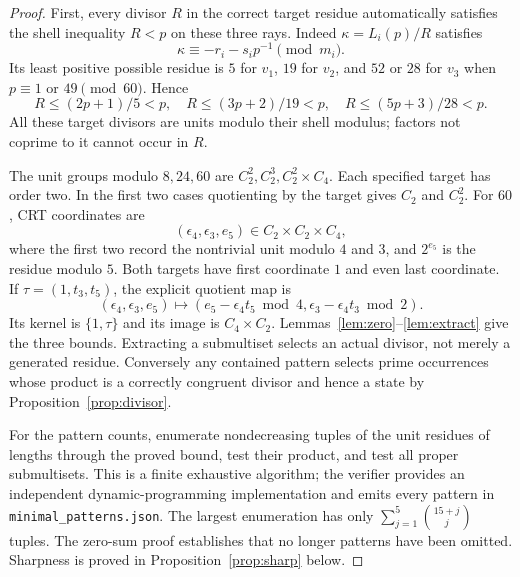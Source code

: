 \documentclass[11pt]{article}
\theoremstyle{remark}\newtheorem{remark}[theorem]{Remark}
\begin{document}
\begin{proof}
First, every divisor $R$ in the correct target residue automatically satisfies the shell inequality $R<p$ on these three rays. Indeed $\kappa=L_i(p)/R$ satisfies
\[
 \kappa\equiv-r_i-s_i p^{-1}\pmod{m_i}.
\]
Its least positive possible residue is $5$ for $v_1$, $19$ for $v_2$, and $52$ or $28$ for $v_3$ when $p\equiv1$ or $49\pmod{60}$. Hence
\[
 R\le(2p+1)/5<p,\quad R\le(3p+2)/19<p,\quad
 R\le(5p+3)/28<p.
\]
All these target divisors are units modulo their shell modulus; factors not coprime to it cannot occur in $R$.

The unit groups modulo $8,24,60$ are $C_2^2,C_2^3,C_2^2\times C_4$. Each specified target has order two. In the first two cases quotienting by the target gives $C_2$ and $C_2^2$. For $60$, CRT coordinates are
\[
 (\epsilon_4,\epsilon_3,e_5)\in C_2\times C_2\times C_4,
\]
where the first two record the nontrivial unit modulo $4$ and $3$, and $2^{e_5}$ is the residue modulo $5$. Both targets have first coordinate $1$ and even last coordinate. If $\tau=(1,t_3,t_5)$, the explicit quotient map is
\[
 (\epsilon_4,\epsilon_3,e_5)\mapsto
 (e_5-\epsilon_4t_5\bmod4,\epsilon_3-\epsilon_4t_3\bmod2).
\]
Its kernel is $\{1,\tau\}$ and its image is $C_4\times C_2$. Lemmas~\ref{lem:zero}--\ref{lem:extract} give the three bounds. Extracting a submultiset selects an actual divisor, not merely a generated residue. Conversely any contained pattern selects prime occurrences whose product is a correctly congruent divisor and hence a state by Proposition~\ref{prop:divisor}.

For the pattern counts, enumerate nondecreasing tuples of the unit residues of lengths through the proved bound, test their product, and test all proper submultisets. This is a finite exhaustive algorithm; the verifier provides an independent dynamic-programming implementation and emits every pattern in \texttt{minimal\_patterns.json}. The largest enumeration has only $\sum_{j=1}^5\binom{15+j}{j}$ tuples. The zero-sum proof establishes that no longer patterns have been omitted. Sharpness is proved in Proposition~\ref{prop:sharp} below.
\end{proof}
\end{document}
